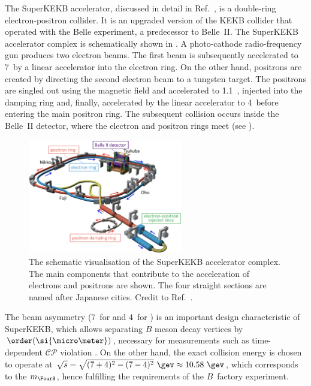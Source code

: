The SuperKEKB accelerator, discussed in detail in Ref.~\cite{Akai:2018mbz}, is a double-ring electron-positron collider.
It is an upgraded version of the KEKB collider \cite{Oide:2009zz} that operated with the Belle experiment, a predecessor to Belle~II.
The SuperKEKB accelerator complex is schematically shown in .
A photo-cathode radio-frequency gun produces two electron beams.
The first beam is subsequently accelerated to 7~\gev by a linear accelerator into the electron ring.
On the other hand, positrons are created by directing the second electron beam to a tungsten target.
The positrons are singled out using the magnetic field and accelerated to 1.1~\gev, injected into the damping ring and, finally,
accelerated by the linear accelerator to 4~\gev before entering the main positron ring.
The subsequent collision occurs inside the Belle~II detector, where the electron and positron rings meet (see ).
\begin{figure}[htbp!]
    \centering
    \includegraphics[width=0.6\textwidth]{figures/experimental_setup/super_kekb.png}
    \caption{\label{fig:superkekb}
        The schematic visualisation of the SuperKEKB accelerator complex.
        The main components that contribute to the acceleration of electrons and positrons are shown.
        The four straight sections are named after Japanese cities.
        Credit to Ref.~\cite{Akai:2018mbz}.
    }
\end{figure}

The beam asymmetry (7~\gev for \en and 4~\gev for \ep) is an important design characteristic of SuperKEKB, 
which allows separating $B$ meson decay vertices by $\order(\si{\micro\meter})$, necessary for measurements such as time-dependent $\mathcal{CP}$ violation \cite{BaBar:2014omp}.
On the other hand, the exact collision energy is chosen to operate at $\sqrt{s}=\sqrt{(7+4)^2-(7-4)^2}~\gev\approx10.58~\gev$, which corresponds to the $m_{\FourS}$, 
hence fulfilling the requirements of the $B$~factory experiment.

